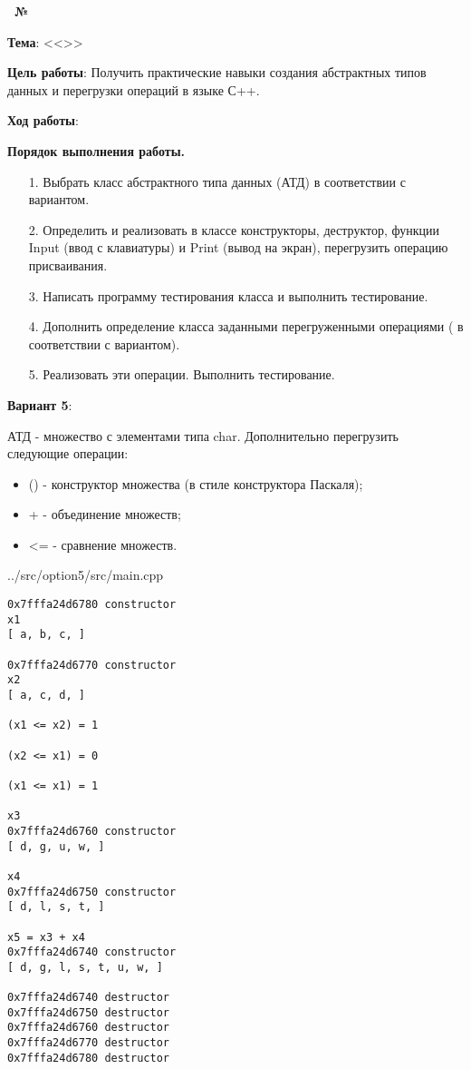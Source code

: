 \begin{center}
    \textbf{\titlePageWorkType~№\titlePageWorkNumber}
\end{center}

\textbf{Тема}: <<\titlePageTopic>>

\textbf{Цель работы}: Получить практические навыки создания абстрактных типов данных и перегрузки операций в языке С++.

\begin{center}
    \textbf{Ход работы}:
\end{center}

\textbf{Порядок выполнения работы.}

\begin{enumerate}
    \item [1.] Выбрать класс абстрактного типа данных (АТД) в соответствии с вариантом.
    \item [2.] Определить и реализовать в классе конструкторы, деструктор, функции Input (ввод с клавиатуры) и Print (вывод на экран), перегрузить операцию присваивания. 
    \item [3.] Написать программу тестирования класса и выполнить тестирование. 
    \item [4.] Дополнить определение класса заданными перегруженными операциями ( в соответствии с вариантом).
    \item [5.] Реализовать эти операции. Выполнить тестирование.
\end{enumerate}

\begin{center}
    \textbf{Вариант 5}:
\end{center}

АТД - множество с элементами типа char.
Дополнительно перегрузить следующие операции:
\begin{itemize}
    \item () - конструктор множества (в стиле конструктора Паскаля);
    \item + - объединение множеств;
    \item <= - сравнение множеств.
\end{itemize}


{../src/option5/src/main.cpp}

\begin{lstlisting}[language=Out,]
0x7fffa24d6780 constructor
x1
[ a, b, c, ]

0x7fffa24d6770 constructor
x2
[ a, c, d, ]

(x1 <= x2) = 1

(x2 <= x1) = 0

(x1 <= x1) = 1

x3
0x7fffa24d6760 constructor
[ d, g, u, w, ]

x4
0x7fffa24d6750 constructor
[ d, l, s, t, ]

x5 = x3 + x4
0x7fffa24d6740 constructor
[ d, g, l, s, t, u, w, ]

0x7fffa24d6740 destructor
0x7fffa24d6750 destructor
0x7fffa24d6760 destructor
0x7fffa24d6770 destructor
0x7fffa24d6780 destructor
\end{lstlisting}
